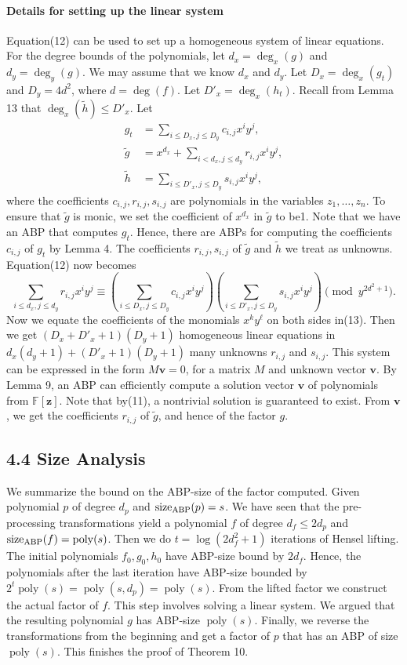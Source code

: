 \documentclass[10pt,a4paper]{article}
\newcommand{\sz}{\operatorname{size}_{\rm ABP}}
\begin{document}
\paragraph{Details for setting up the linear system}
Equation(12) can be used to set up a homogeneous system of linear equations. For the degree bounds of the polynomials, let $d_x=\deg_x(g)$ and $d_y=\deg_y(g)$. We may assume that we know $d_x$ and $d_y$. Let $D_x=\deg_x(g_t)$ and $D_y=4d^2$, where $d=\deg(f)$. Let $D'_x=\deg_x(h_t)$. Recall from Lemma 13 that $\deg_x(\widetilde h)\leq D'_x$. Let
\begin{align*}g_t&=\sum_{i\leq D_x,j\leq D_y}c_{i,j}x^iy^j,\\\widetilde g&=x^{d_x}+\sum_{i<d_x,j\leq d_y}r_{i,j}x^iy^j,\\\widetilde h&=\sum_{i\leq D'_x,j\leq D_y}s_{i,j}x^iy^j,\end{align*}
where the coefficients $c_{i,j},r_{i,j},s_{i,j}$ are polynomials in the variables $z_1,\ldots,z_n$. To ensure that $\widetilde g$ is monic, we set the coefficient of $x^{d_x}$ in $\widetilde g$ to be1.
Note that we have an ABP that computes $g_t$. Hence, there are ABPs for computing the coefficients $c_{i,j}$ of $g_t$ by Lemma 4. The coefficients $r_{i,j},s_{i,j}$ of $\widetilde g$ and $\widetilde h$ we treat as unknowns. Equation(12) now becomes
\begin{equation}\sum_{i\leq d_x,j\leq d_y}r_{i,j}x^iy^j\equiv\left(\sum_{i\leq D_x,j\leq D_y}c_{i,j}x^iy^j\right)\left(\sum_{i\leq D'_x,j\leq D_y}s_{i,j}x^iy^j\right)\pmod{y^{2d^2+1}}.\tag{13}\end{equation}
Now we equate the coefficients of the monomials $x^ky^\ell$ on both sides in(13). Then we get $(D_x+D'_x+1)(D_y+1)$ homogeneous linear equations in $d_x(d_y+1)+(D'_x+1)(D_y+1)$ many unknowns $r_{i,j}$ and $s_{i,j}$. This system can be expressed in the form $M\mathbf v=0$, for a matrix $M$ and unknown vector $\mathbf v$.
By Lemma 9, an ABP can efficiently compute a solution vector $\mathbf v$ of polynomials from $\mathbb F[\mathbf z]$. Note that by(11), a nontrivial solution is guaranteed to exist. From $\mathbf v$, we get the coefficients $r_{i,j}$ of $\widetilde g$, and hence of the factor $g$.
\subsection*{4.4 Size Analysis}
We summarize the bound on the ABP-size of the factor computed. Given polynomial $p$ of degree $d_p$ and $\sz(p)=s$. We have seen that the pre-processing transformations yield a polynomial $f$ of degree $d_f\leq2d_p$ and $\sz(f)=\operatorname{poly}(s)$. Then we do $t=\log(2d_f^2+1)$ iterations of Hensel lifting. The initial polynomials $f_0,g_0,h_0$ have ABP-size bound by $2d_f$. Hence, the polynomials after the last iteration have ABP-size bounded by $2^t\operatorname{poly}(s)=\operatorname{poly}(s,d_p)=\operatorname{poly}(s)$.
From the lifted factor we construct the actual factor of $f$. This step involves solving a linear system. We argued that the resulting polynomial $g$ has ABP-size $\operatorname{poly}(s)$.
Finally, we reverse the transformations from the beginning and get a factor of $p$ that has an ABP of size $\operatorname{poly}(s)$. This finishes the proof of Theorem 10.
\end{document}
